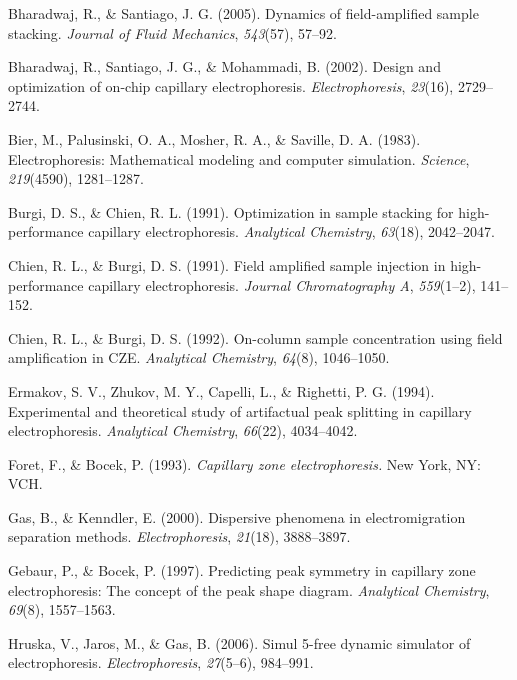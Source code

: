 \documentclass[lineno,authoryear]{FLO_v1}%
\theoremstyle{definition}
\begin{document}
\begin{Backmatter}
\begin{thebibliography}{}
Bharadwaj, R., {\&} Santiago, J. G. (2005). Dynamics of
field-amplified sample stacking. \textit{Journal of Fluid
Mechanics}, \textit{543}(57), 57--92.

Bharadwaj, R., Santiago, J. G., {\&} Mohammadi, B. (2002).
Design and optimization of on-chip capillary
electrophoresis. \textit{Electrophoresis}, \textit{23}(16),
2729--2744.

Bier, M., Palusinski, O. A., Mosher, R. A., {\&} Saville,
D. A. (1983). Electrophoresis: Mathematical modeling and
computer simulation. \textit{Science}, \textit{219}(4590),
1281--1287.

Burgi, D. S., {\&} Chien, R. L. (1991). Optimization in
sample stacking for high-performance capillary
electrophoresis. \textit{Analytical Chemistry},
\textit{63}(18), 2042--2047.

Chien, R. L., {\&} Burgi, D. S. (1991). Field amplified
sample injection in high-performance capillary
electrophoresis. \textit{Journal Chromatography A},
\textit{559}(1--2), 141--152.

Chien, R. L., {\&} Burgi, D. S. (1992). On-column sample
concentration using field amplification in CZE.
\textit{Analytical Chemistry}, \textit{64}(8), 1046--1050.

Ermakov, S. V., Zhukov, M. Y., Capelli, L., {\&} Righetti,
P. G. (1994). Experimental and theoretical study of
artifactual peak splitting in capillary electrophoresis.
\textit{Analytical Chemistry}, \textit{66}(22), 4034--4042.

Foret, F., {\&} Bocek, P. (1993). \textit{Capillary zone
electrophoresis.} New York, NY: VCH.

Gas, B., {\&} Kenndler, E. (2000). Dispersive phenomena in
electromigration separation methods.
\textit{Electrophoresis}, \textit{21}(18), 3888--3897.

Gebaur, P., {\&} Bocek, P. (1997). Predicting peak symmetry
in capillary zone electrophoresis: The concept of the peak
shape diagram. \textit{Analytical Chemistry},
\textit{69}(8), 1557--1563.

Hruska, V., Jaros, M., {\&} Gas, B. (2006). Simul 5-free
dynamic simulator of electrophoresis.
\textit{Electrophoresis}, \textit{27}(5--6), 984--991.


\end{thebibliography}
\end{Backmatter}
\end{document}
